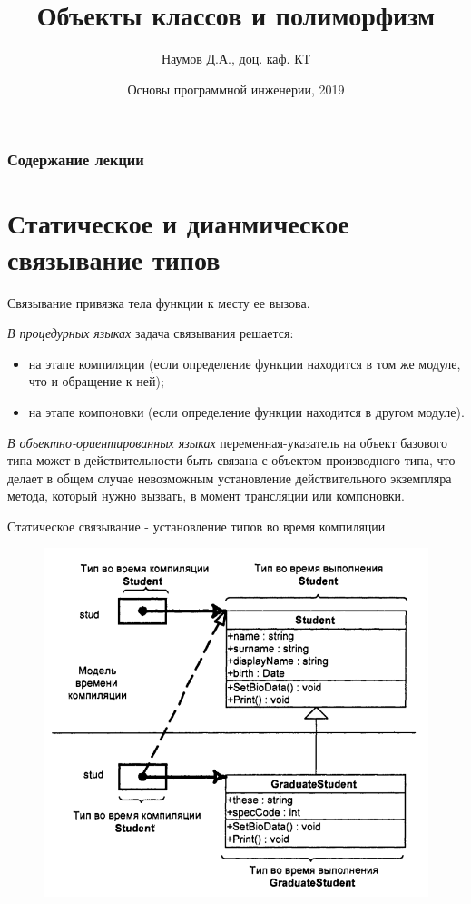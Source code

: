 \documentclass{beamer}
\title[Software Design]{Объекты классов и полиморфизм}
\author{Наумов Д.А., доц. каф. КТ}
\date[14.10.2019] {Основы программной инженерии, 2019}
\begin{document}
\begin{frame}
  \titlepage
\end{frame}
  
\begin{frame}
  \frametitle{Содержание лекции}
  \tableofcontents  
\end{frame}

\section{Статическое и дианмическое связывание типов}
\begin{frame}
\begin{block}{Связывание}
привязка тела функции к месту ее вызова.
\end{block}
\textit{В процедурных языках} задача связывания решается:
\begin{itemize}
\item на этапе компиляции (если определение функции находится в том же модуле, что и обращение к ней);
\item на этапе компоновки (если определение функции находится в другом модуле). 
\end{itemize}
\textit{В объектно-ориентированных языках} переменная-указатель
на объект базового типа может в действительности быть связана с объектом 
производного типа, что делает в общем случае невозможным установление
действительного экземпляра метода, который нужно вызвать, в момент трансляции или компоновки.
\end{frame}

\begin{frame}{Статическое связывание - установление типов во время компиляции}
\begin{figure}[h]
\centering
\includegraphics[scale=0.4]{images/lec07-pic01.png}
\end{figure}
\end{frame}
\end{document}
